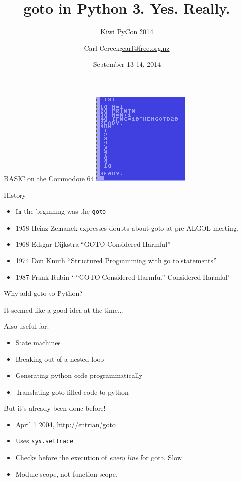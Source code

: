 \documentclass{beamer}
\title{goto in Python 3. Yes. Really.}
\subtitle{Kiwi PyCon 2014}
\author{\texorpdfstring{Carl Cerecke\newline\url{carl@free.org.nz}}{Carl Cerecke}}
\institute{https://github.com/cdjc/goto}
\date{September 13-14, 2014}
\begin{document}
    \begin{frame}[plain]
        \titlepage
    \end{frame}

\begin{frame}[fragile]{BASIC on the Commodore 64}
\includegraphics{c64.png}
\end{frame}

\begin{frame}{History}

\begin{itemize}
\item In the beginning was the \texttt{goto}
\item 1958 Heinz Zemanek expresses doubts about goto at pre-ALGOL meeting.
\item 1968 Edsgar Dijkstra ``GOTO Considered Harmful''
\item 1974 Don Knuth ``Structured Programming with go to statements''
\item 1987 Frank Rubin ` ``GOTO Considered Harmful'' Considered Harmful'
\end{itemize}

\end{frame}

\begin{frame}{Why add goto to Python?}

It seemed like a good idea at the time...
\vspace{1cm}

Also useful for:
\begin{itemize}
\item State machines
\item Breaking out of a nested loop
\item Generating python code programmatically
\item Translating goto-filled code to python
\end{itemize}

\end{frame}

\begin{frame}{But it's already been done before!}

\begin{itemize}
\item April 1 2004, \href{http://entrian/goto}{http://entrian/goto}

\item Uses \texttt{sys.settrace}

\item Checks before the execution of \emph{every line} for goto. Slow

\item Module scope, not function scope.
\end{itemize}
\end{frame}
\end{document}
